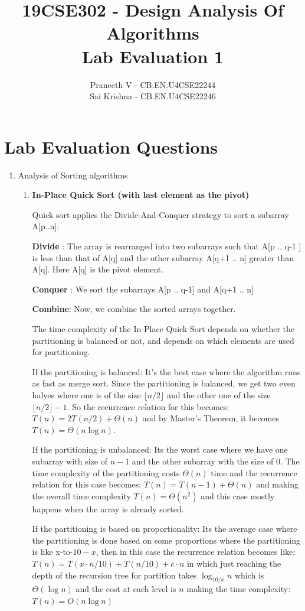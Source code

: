 \documentclass{article}
\title{19CSE302 - Design Analysis Of Algorithms \\ Lab Evaluation 1}
\author{Praneeth V - CB.EN.U4CSE22244 \\ Sai Krishna - CB.EN.U4CSE22246}
\begin{document}
\maketitle

\section*{Lab Evaluation Questions}

\begin{enumerate}
    \item Analysis of Sorting algorithms
    \begin{enumerate}[label*=\arabic*.]
      \item \textbf{In-Place Quick Sort (with last element as the pivot)}

        Quick sort applies the Divide-And-Conquer strategy to sort a subarray A[p..n]:


        \textbf{Divide} : The array is rearranged into two subarrays such that A[p .. q-1 ] is less than that of A[q] and the other subarray A[q+1 .. n] 
        greater than A[q]. Here A[q] is the pivot element.

        \textbf{Conquer} : We sort the subarrays A[p .. q-1] and A[q+1 .. n]

        \textbf{Combine}: Now, we combine the sorted arrays together. 

        The time complexity of the In-Place Quick Sort depends on whether the partitioning is balanced or not, and depends on which elements are used for partitioning. 

        If the partitioning is balanced: It's the best case where the algorithm runs as fast as merge sort. Since the partitioning is balanced, we get two even halves where one is of the size \( \lfloor n/2 \rfloor \) and the other one of the size \( \lfloor n/2 \rfloor - 1 \). So the recurrence relation for this becomes: \( T(n) = 2 T(n/2) + \Theta(n) \) and by Master's Theorem, it becomes \( T(n) = \Theta(n \log n) \). 

        If the partitioning is unbalanced: Its the worst case where we have one subarray with size of \( n-1 \) and the other subarray with the size of 0. The time complexity of the partitioning costs \( \Theta(n) \) time and the recurrence relation for this case becomes:
        \( T(n) = T(n - 1) + \Theta(n) \) and making the overall time complexity \( T(n) = \Theta(n^2) \) and this case mostly happens when the array is already sorted. 

        If the partitioning is based on proportionality: Its the average case where the partitioning is done based on some proportions where the partitioning is like x-to-\(10-x\), then in this case the recurrence relation becomes like: \( T(n) = T(x \cdot n/10) + T(n/10) + c \cdot n \) in which just reaching the depth of the recursion tree for partition takes \( \log_{10/x} n \) which is \( \Theta(\log n) \) and the cost at each level is \( n \) making the time complexity: \( T(n) = O(n \log n) \)


\end{enumerate}
\end{enumerate}
\end{document}
